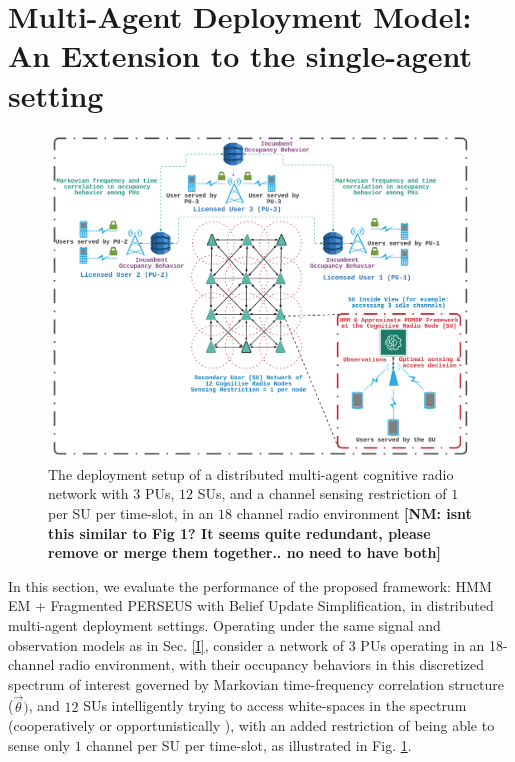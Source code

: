 \documentclass[12pt, draftcls, onecolumn]{IEEEtran}
\newcommand{\nm}[1]{{\color{blue}\bf{[NM: #1]}}}
\begin{document}
\section{Multi-Agent Deployment Model: An Extension to the single-agent setting}\label{Z}
\begin{figure} [htb]
    \centerline{
    \includegraphics[width = 0.8\linewidth]{figures/Minerva_Multiagent_System_Model.png}}
    \caption{The deployment setup of a distributed multi-agent cognitive radio network with $3$ PUs, $12$ SUs, and a channel sensing restriction of $1$ per SU per time-slot, in an $18$ channel radio environment
   \nm{isnt this similar to Fig 1? It seems quite redundant, please remove or merge them together.. no need to have both} 
    }
    \label{fig: Z. 0}
\end{figure}
In this section, we evaluate the performance of the proposed framework: HMM EM + Fragmented PERSEUS with Belief Update Simplification, in distributed multi-agent deployment settings. Operating under the same signal and observation models as in Sec. \ref{I}, consider a network of $3$ PUs operating in an 18-channel radio environment, with their occupancy behaviors in this discretized spectrum of interest governed by Markovian time-frequency correlation structure ($\vec{\theta})$, and $12$ SUs intelligently trying to access white-spaces in the spectrum (cooperatively \cite{WCL:5} or opportunistically \cite{WCL:MIT}), with an added restriction of being able to sense only $1$ channel per SU per time-slot, as illustrated in Fig. \ref{fig: Z. 0}.
\end{document}
